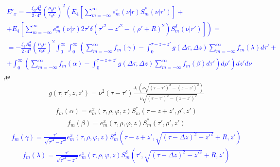 \textcolor{blue} { \begin{equation*} \begin{aligned}
E'_x = - \frac{\xi_3 A_0^3}{2 \cdot 4^3} \left(
\frac{\mu_0 \mu} {\epsilon_0 \epsilon} \right)^2
\left( E_4 \left[ \sum_{m=-\infty}^\infty 
e_m^x (\nu | r) S_m^* (\nu | r') \right] \right. + \\
+ \left. E_4 \left[ \sum_{m=-\infty}^\infty 
e_m^x (\nu | r) 2 \tau' \delta \left( {\tau'}^2 - {z'}^2 - (\rho'+R)^2 \right) 
S_m^\delta (\nu | r') \right] \right) = \\
= - \frac{\xi_3 A_0^3}{2 \cdot 4^3} \left(
\frac{\mu_0 \mu} {\epsilon_0 \epsilon} \right)^2
\int_0^\infty \int_0^\infty \left( \sum_{m=-\infty}^\infty f_m (\gamma) - 
\int_0^{\tau - z + z'} g(\Delta \tau, \Delta z)
\sum_{m=-\infty}^\infty f_m (\lambda) d \tau' + \right. \\ 
\left. + \int_0^\infty \left( \sum_{m=-\infty}^\infty f_m (\alpha) - 
\int_0^{\tau - z + z'} g(\Delta \tau, \Delta z)
\sum_{m=-\infty}^\infty f_m (\beta) d \tau' \right) d \rho' \right) dz' d \nu
\end{aligned} \end{equation*} }
%
де
%
\begin{equation*} \begin{aligned}
g(\tau, \tau', z, z') = \nu^2 (\tau - \tau') 
\frac{J_1 \left( \nu \sqrt{(\tau - \tau')^2 - (z - z')^2} \right)}
{\nu \sqrt{(\tau - \tau')^2 - (z - z')^2}}
\end{aligned} \end{equation*}
%
\begin{equation*} \begin{aligned}
f_m (\alpha) = e_m^x (\tau,\rho,\varphi,z) S_m^* (\tau-z+z',\rho',z')
\end{aligned} \end{equation*}
%
\begin{equation*} \begin{aligned}
f_m (\beta) = e_m^x (\tau,\rho,\varphi,z) S_m^* (\tau',\rho',z')
\end{aligned} \end{equation*}
%
\textcolor{blue} { \begin{equation*} \begin{aligned}
f_m (\gamma) = \frac{\tau'}{\sqrt{{\tau'}^2 - {z'}^2}} 
e_m^x (\tau,\rho,\varphi,z) S_m^\delta 
\left( \tau-z+z',\sqrt{(\tau-\Delta z)^2 - {z'}^2}+R,z' \right)
\end{aligned} \end{equation*} }
%
\textcolor{blue} { \begin{equation*} \begin{aligned}
f_m (\lambda) = \frac{\tau'}{\sqrt{{\tau'}^2 - {z'}^2}}
e_m^x (\tau,\rho,\varphi,z) S_m^\delta 
\left( \tau',\sqrt{(\tau-\Delta z)^2 - {z'}^2}+R,z' \right)
\end{aligned} \end{equation*} }

